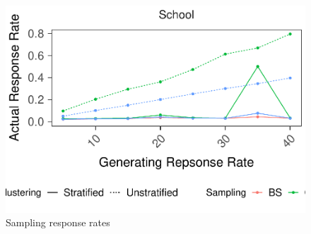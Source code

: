 \documentclass[man,floatsintext]{apa6}
\begin{document}
\begin{figure}
\centering
\includegraphics{Results_files/figure-latex/unnamed-chunk-10-1.pdf}
\caption{\label{fig:unnamed-chunk-10}Sampling response rates}
\end{figure}
\end{document}
